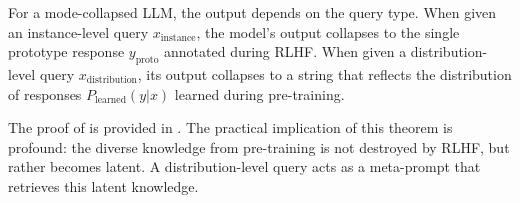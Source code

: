 


\begin{theorem} \label{theorem:different_modes_for_different_queries}
For a mode-collapsed LLM, the output depends on the query type. When given an instance-level query $x_{\text{instance}}$, the model's output collapses to the single prototype response $y_{\text{proto}}$ 
annotated during RLHF. When given a distribution-level query $x_{\text{distribution}}$, its output collapses to a string that reflects the distribution of responses $P_{\text{learned}}(y|x)$ learned during pre-training.
\end{theorem}

The proof of  is provided in . The practical implication of this theorem is profound: the diverse knowledge from pre-training is not destroyed by RLHF, but rather becomes latent. A distribution-level query acts as a meta-prompt that retrieves this latent knowledge.